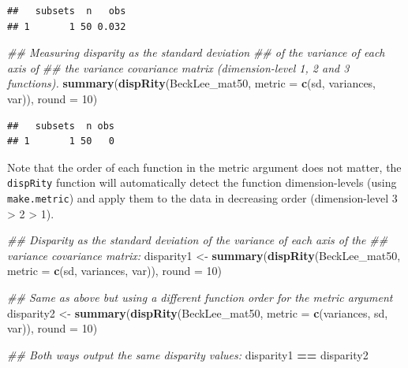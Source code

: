\documentclass[
]{book}
\newenvironment{Shaded}{\begin{snugshade}}{\end{snugshade}}
\newcommand{\CommentTok}[1]{\textcolor[rgb]{0.56,0.35,0.01}{\textit{#1}}}
\newcommand{\DataTypeTok}[1]{\textcolor[rgb]{0.13,0.29,0.53}{#1}}
\newcommand{\DecValTok}[1]{\textcolor[rgb]{0.00,0.00,0.81}{#1}}
\newcommand{\KeywordTok}[1]{\textcolor[rgb]{0.13,0.29,0.53}{\textbf{#1}}}
\newcommand{\NormalTok}[1]{#1}
\newcommand{\OperatorTok}[1]{\textcolor[rgb]{0.81,0.36,0.00}{\textbf{#1}}}
\newcommand{\StringTok}[1]{\textcolor[rgb]{0.31,0.60,0.02}{#1}}
\begin{document}
\begin{verbatim}
##   subsets  n   obs
## 1       1 50 0.032
\end{verbatim}

\begin{Shaded}
\begin{Highlighting}[]
\CommentTok{\#\# Measuring disparity as the standard deviation}
\CommentTok{\#\# of the variance of each axis of}
\CommentTok{\#\# the variance covariance matrix (dimension{-}level 1, 2 and 3 functions).}
\KeywordTok{summary}\NormalTok{(}\KeywordTok{dispRity}\NormalTok{(BeckLee\_mat50, }\DataTypeTok{metric =} \KeywordTok{c}\NormalTok{(sd, variances, var)), }\DataTypeTok{round =} \DecValTok{10}\NormalTok{)}
\end{Highlighting}
\end{Shaded}

\begin{verbatim}
##   subsets  n obs
## 1       1 50   0
\end{verbatim}

Note that the order of each function in the metric argument does not matter, the \texttt{dispRity} function will automatically detect the function dimension-levels (using \texttt{make.metric}) and apply them to the data in decreasing order (dimension-level 3 \textgreater{} 2 \textgreater{} 1).

\begin{Shaded}
\begin{Highlighting}[]
\CommentTok{\#\# Disparity as the standard deviation of the variance of each axis of the}
\CommentTok{\#\# variance covariance matrix:}
\NormalTok{disparity1 \textless{}{-}}\StringTok{ }\KeywordTok{summary}\NormalTok{(}\KeywordTok{dispRity}\NormalTok{(BeckLee\_mat50,}
                               \DataTypeTok{metric =} \KeywordTok{c}\NormalTok{(sd, variances, var)),}
                      \DataTypeTok{round =} \DecValTok{10}\NormalTok{)}

\CommentTok{\#\# Same as above but using a different function order for the metric argument}
\NormalTok{disparity2 \textless{}{-}}\StringTok{ }\KeywordTok{summary}\NormalTok{(}\KeywordTok{dispRity}\NormalTok{(BeckLee\_mat50,}
                               \DataTypeTok{metric =} \KeywordTok{c}\NormalTok{(variances, sd, var)),}
                      \DataTypeTok{round =} \DecValTok{10}\NormalTok{)}

\CommentTok{\#\# Both ways output the same disparity values:}
\NormalTok{disparity1 }\OperatorTok{==}\StringTok{ }\NormalTok{disparity2}
\end{Highlighting}
\end{Shaded}
\end{document}
